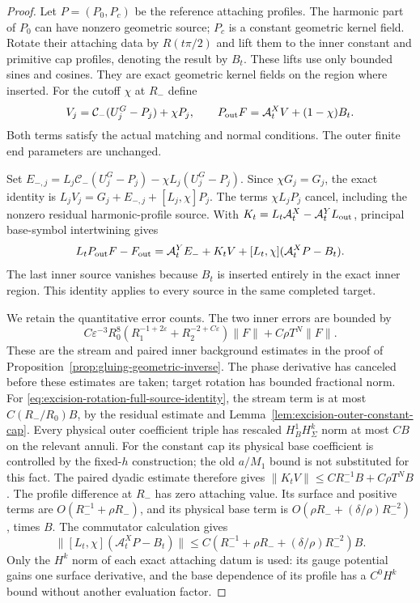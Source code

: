 \documentclass[11pt]{amsart}
\theoremstyle{definition}
\theoremstyle{remark}
\theoremstyle{plain}
\begin{document}
\begin{proof}
Let $P=(P_0,P_c)$ be the reference attaching
profiles. The harmonic part of $P_0$ can
have nonzero geometric source; $P_c$ is a
constant geometric kernel field.
Rotate their attaching data by $R(t\pi/2)$
and lift them to the inner constant and
primitive cap profiles, denoting the result
by $B_t$. These lifts use only bounded
sines and cosines. They are exact geometric
kernel fields on the region where inserted.
For the cutoff $\chi$ at $R_-$ define
\[
 V_j=\mathcal C_-(U_j^G-P_j)+\chi P_j,\qquad
                 P_{\rm out}F=\mathcal A_t^XV+(1-\chi)B_t .
\]
Both terms satisfy the actual matching and
normal conditions. The outer finite end
parameters are unchanged.

Set
$E_{-,j}=L_j\mathcal C_-(U_j^G-P_j)
                    -\chi L_j(U_j^G-P_j)$.
Since $\chi G_j=G_j$, the exact identity is
$L_jV_j=G_j+E_{-,j}+[L_j,\chi]P_j$.
The terms $\chi L_jP_j$ cancel, including
the nonzero residual harmonic-profile source.
With
$K_t=L_t\mathcal A_t^X-\mathcal A_t^YL_{\rm out}$,
principal base-symbol intertwining gives
\begin{equation}\label{eq:excision-rotation-full-source-identity}
 L_tP_{\rm out}F-F_{\rm out}
      =\mathcal A_t^YE_-+K_tV
                    +[L_t,\chi](\mathcal A_t^XP-B_t).
\end{equation}
The last inner source vanishes because $B_t$
is inserted entirely in the exact inner region.
This identity applies to every source in the
same completed target.

We retain the quantitative error counts.
The two inner errors are bounded by
\[
 C\varepsilon^{-3}R_0^8
       (R_1^{-1+2\varepsilon}+R_2^{-2+C\varepsilon})\|F\|
                                      +C\rho T^N\|F\|.
\]
These are the stream and paired inner
background estimates in the proof of
Proposition~\ref{prop:gluing-geometric-inverse}.
The phase derivative has canceled before
these estimates are taken; target rotation
has bounded fractional norm.
For \eqref{eq:excision-rotation-full-source-identity},
the stream term is at most $C(R_-/R_0)B$,
by the residual estimate and
Lemma~\ref{lem:excision-outer-constant-cap}.
Every physical outer coefficient triple
has rescaled $H^1_BH^k_\Sigma$ norm at most
$CB$ on the relevant annuli.
For the constant cap its physical base
coefficient is controlled by the fixed-$h$
construction; the old $a/M_1$ bound is not
substituted for this fact.
The paired dyadic estimate therefore gives
$\|K_tV\|\leq CR_-^{-1}B+C\rho T^NB$.
The profile difference at $R_-$ has zero
attaching value. Its surface and positive
terms are $O(R_-^{-1}+\rho R_-)$, and its
physical base term is
$O(\rho R_-+(\delta/\rho)R_-^{-2})$, times $B$.
The commutator calculation gives
\[
 \|[L_t,\chi](\mathcal A_t^XP-B_t)\|
       \leq C(R_-^{-1}+\rho R_-+(\delta/\rho)R_-^{-2})B .
\]
Only the $H^k$ norm of each exact attaching
datum is used: its gauge potential gains
one surface derivative, and the base
dependence of its profile has a $C^0H^k$
bound without another evaluation factor.


\end{proof}
\end{document}
